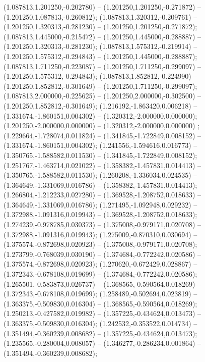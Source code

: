  (1.087813,1.201250,-0.202780) -- (1.201250,1.201250,-0.271872) -- (1.201250,1.087813,-0.260812);
 (1.087813,1.320312,-0.209761) -- (1.201250,1.320313,-0.281230) -- (1.201250,1.201250,-0.271872);
 (1.087813,1.445000,-0.215472) -- (1.201250,1.445000,-0.288887) -- (1.201250,1.320313,-0.281230);
 (1.087813,1.575312,-0.219914) -- (1.201250,1.575312,-0.294843) -- (1.201250,1.445000,-0.288887);
 (1.087813,1.711250,-0.223087) -- (1.201250,1.711250,-0.299097) -- (1.201250,1.575312,-0.294843);
 (1.087813,1.852812,-0.224990) -- (1.201250,1.852812,-0.301649) -- (1.201250,1.711250,-0.299097);
 (1.087813,2.000000,-0.225625) -- (1.201250,2.000000,-0.302500) -- (1.201250,1.852812,-0.301649);
 (1.216192,-1.863420,0.006218) -- (1.331674,-1.860151,0.004302) -- (1.320312,-2.000000,0.000000);
 (1.201250,-2.000000,0.000000) -- (1.320312,-2.000000,0.000000) ;
 (1.229664,-1.728074,0.011824) -- (1.341845,-1.722849,0.008152) -- (1.331674,-1.860151,0.004302);
 (1.241556,-1.594616,0.016773) -- (1.350765,-1.588582,0.011530) -- (1.341845,-1.722849,0.008152);
 (1.251767,-1.463714,0.021022) -- (1.358382,-1.457831,0.014413) -- (1.350765,-1.588582,0.011530);
 (1.260208,-1.336034,0.024535) -- (1.364649,-1.331069,0.016786) -- (1.358382,-1.457831,0.014413);
 (1.266804,-1.212233,0.027280) -- (1.369528,-1.208752,0.018633) -- (1.364649,-1.331069,0.016786);
 (1.271495,-1.092948,0.029232) -- (1.372988,-1.091316,0.019943) -- (1.369528,-1.208752,0.018633);
 (1.274239,-0.978785,0.030373) -- (1.375008,-0.979171,0.020708) -- (1.372988,-1.091316,0.019943);
 (1.275009,-0.870310,0.030694) -- (1.375574,-0.872698,0.020923) -- (1.375008,-0.979171,0.020708);
 (1.273799,-0.768039,0.030190) -- (1.374684,-0.772242,0.020586) -- (1.375574,-0.872698,0.020923);
 (1.270620,-0.672429,0.028867) -- (1.372343,-0.678108,0.019699) -- (1.374684,-0.772242,0.020586);
 (1.265501,-0.583873,0.026737) -- (1.368565,-0.590564,0.018269) -- (1.372343,-0.678108,0.019699);
 (1.258489,-0.502694,0.023819) -- (1.363375,-0.509830,0.016304) -- (1.368565,-0.590564,0.018269);
 (1.250213,-0.427582,0.019982) -- (1.357225,-0.434624,0.013473) -- (1.363375,-0.509830,0.016304);
 (1.242532,-0.353522,0.014734) -- (1.351494,-0.360239,0.008682) -- (1.357225,-0.434624,0.013473);
 (1.235565,-0.280004,0.008057) -- (1.346277,-0.286234,0.001864) -- (1.351494,-0.360239,0.008682);
